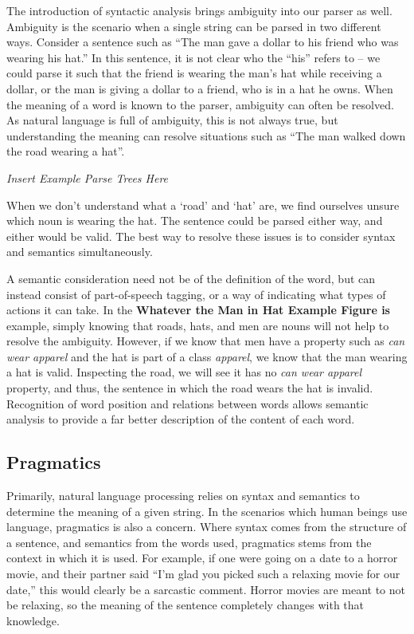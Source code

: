 The introduction of syntactic analysis brings ambiguity into our parser as well. Ambiguity is the scenario when a single string can be parsed in two different ways. Consider a sentence such as ``The man gave a dollar to his friend who was wearing his hat.'' In this sentence, it is not clear who the ``his'' refers to -- we could parse it such that the friend is wearing the man's hat while receiving a dollar, or the man is giving a dollar to a friend, who is in a hat he owns. When the meaning of a word is known to the parser, ambiguity can often be resolved. As natural language is full of ambiguity, this is not always true, but understanding the meaning can resolve situations such as ``The man walked down the road wearing a hat''.

\textit{Insert Example Parse Trees Here}

When we don't understand what a `road' and `hat' are, we find ourselves unsure which noun is wearing the hat. The sentence could be parsed either way, and either would be valid. The best way to resolve these issues is to consider syntax and semantics simultaneously.

A semantic consideration need not be of the definition of the word, but can instead consist of part-of-speech tagging, or a way of indicating what types of actions it can take. In the \textbf{Whatever the Man in Hat Example Figure is} example, simply knowing that roads, hats, and men are nouns will not help to resolve the ambiguity. However, if we know that men have a property such as \textit{can wear apparel} and the hat is part of a class \textit{apparel}, we know that the man wearing a hat is valid. Inspecting the road, we will see it has no \textit{can wear apparel} property, and thus, the sentence in which the road wears the hat is invalid. Recognition of word position and relations between words allows semantic analysis to provide a far better description of the content of each word.

\subsection{Pragmatics}
Primarily, natural language processing relies on syntax and semantics to determine the meaning of a given string. In the scenarios which human beings use language, pragmatics is also a concern. Where syntax comes from the structure of a sentence, and semantics from the words used, pragmatics stems from the context in which it is used. For example, if one were going on a date to a horror movie, and their partner said ``I'm glad you picked such a relaxing movie for our date,'' this would clearly be a sarcastic comment. Horror movies are meant to not be relaxing, so the meaning of the sentence completely changes with that knowledge.

